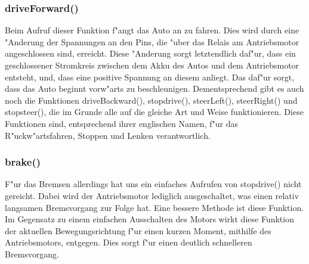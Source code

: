 \documentclass[a4paper,12pt]{article}
\begin{document}
\subsubsection{driveForward()}\label{sec2.2.2}

Beim Aufruf dieser Funktion f"angt das Auto an zu fahren.
Dies wird durch eine "Anderung der Spannungen an den Pins, die "uber das Relais am Antriebsmotor angeschlossen sind, erreicht.
Diese "Anderung sorgt letztendlich daf"ur, dass ein geschlossener Stromkreis zwischen dem Akku des Autos und dem Antriebsmotor entsteht, und, dass eine positive Spannung an diesem anliegt.
Das daf"ur sorgt, dass das Auto beginnt vorw"arts zu beschleunigen.
Dementsprechend gibt es auch noch die Funktionen driveBackward(), stopdrive(), steerLeft(), steerRight() und stopsteer(), die im Grunde alle auf die gleiche Art und Weise funktionieren.
Diese Funktionen sind, entsprechend ihrer englischen Namen, f"ur das R"uckw"artsfahren, Stoppen und Lenken verantwortlich.

\subsubsection{brake()}\label{sec2.2.3}

F"ur das Bremsen allerdings hat uns ein einfaches Aufrufen von stopdrive() nicht gereicht.
Dabei wird der Antriebsmotor lediglich ausgeschaltet, was einen relativ langsamen Bremsvorgang zur Folge hat.
Eine bessere Methode ist diese Funktion.
Im Gegensatz zu einem einfachen Ausschalten des Motors wirkt diese Funktion der aktuellen Bewegungsrichtung f"ur einen kurzen Moment, mithilfe des Antriebsmotors, entgegen.
Dies sorgt f"ur einen deutlich schnelleren Bremsvorgang.
\end{document}
